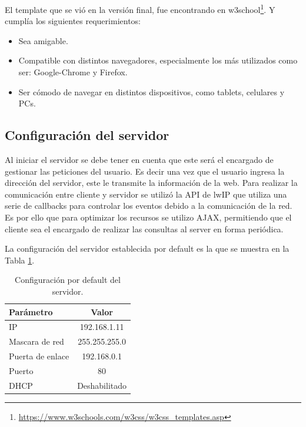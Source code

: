 El template que se vió en la versión final, fue encontrando en w3school\footnote{\url{https://www.w3schools.com/w3css/w3css_templates.asp}}.
Y cumplía los siguientes requerimientos:
\begin{itemize}
  \item Sea amigable.
  \item Compatible con distintos navegadores, especialmente los más utilizados como ser: Google-Chrome y Firefox. 
  \item Ser cómodo de navegar en distintos dispositivos, como tablets, celulares y PCs.
\end{itemize}


\subsection{Configuración del servidor}
Al iniciar el servidor se debe tener en cuenta que este será el encargado de gestionar las peticiones del usuario. 
Es decir una vez que el usuario ingresa la dirección del servidor, este le transmite la información de la web.
Para realizar la comunicación entre cliente y servidor se utilizó la API de lwIP \citep{webserver}  que utiliza una serie de callbacks para controlar los eventos debido a la comunicación de la red. Es por ello que para optimizar los recursos se utilizo AJAX, permitiendo que el cliente sea el encargado de realizar las consultas al server en forma periódica.

La configuración del servidor establecida por default es la que se muestra en la Tabla \ref{tab:servercfg}.
\begin{table}[!h]
  \centering
  \begin{tabular}{l c}
    \hline 
    Parámetro    & Valor \\
    \hline \hline
    IP               & 192.168.1.11 \\
    Mascara de red   & 255.255.255.0 \\
    Puerta de enlace & 192.168.0.1 \\
    Puerto           & 80 \\
    DHCP             & Deshabilitado \\
    \hline
  \end{tabular}
  \caption{Configuración por default del servidor.}
  \label{tab:servercfg}
\end{table}


